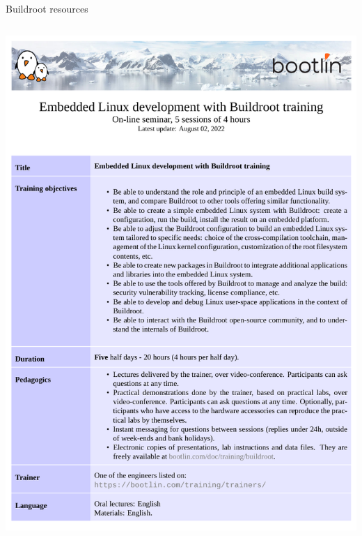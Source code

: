 \begin{frame}{Buildroot resources}
\begin{columns}
\begin{center}
      \includegraphics[height=0.4\textheight]{slides/sysdev-build-systems/br-training.png}
    \end{center}
  \end{columns}
\end{frame}

